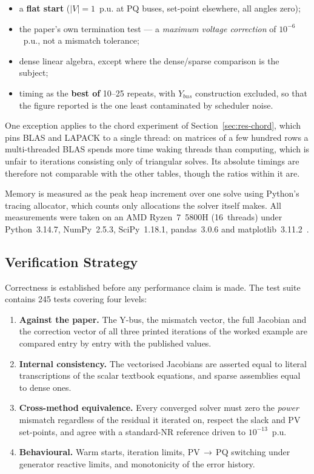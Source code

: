 \documentclass[sigconf,nonacm]{acmart}
\begin{document}
\begin{itemize}
\item a \textbf{flat start} ($|V| = 1$~p.u. at PQ buses, set-point elsewhere,
      all angles zero);
\item the paper's own termination test --- a \emph{maximum voltage correction}
      of $10^{-6}$~p.u., not a mismatch tolerance;
\item dense linear algebra, except where the dense/sparse comparison is the
      subject;
\item timing as the \textbf{best of} 10--25 repeats, with $Y_{bus}$
      construction excluded, so that the figure reported is the one least
      contaminated by scheduler noise.
\end{itemize}

\noindent One exception applies to the chord experiment of
Section~\ref{sec:res-chord}, which pins BLAS and LAPACK to a single thread:
on matrices of a few hundred rows a multi-threaded BLAS spends more time waking
threads than computing, which is unfair to iterations consisting only of
triangular solves. Its absolute timings are therefore not comparable with the
other tables, though the ratios within it are.

Memory is measured as the peak heap increment over one solve using
Python's tracing allocator, which counts only allocations the solver itself
makes. All measurements were taken on an AMD Ryzen~7~5800H (16~threads) under
Python~3.14.7, NumPy~2.5.3, SciPy~1.18.1, pandas~3.0.6 and
matplotlib~3.11.2~\cite{numpy,scipy,matplotlib,pandas}.

\subsection{Verification Strategy}
Correctness is established before any performance claim is made. The test suite
contains 245 tests covering four levels:

\begin{enumerate}
\item \textbf{Against the paper.} The Y-bus, the mismatch vector, the full
      Jacobian and the correction vector of all three printed iterations of the
      worked example are compared entry by entry with the published values.
\item \textbf{Internal consistency.} The vectorised Jacobians are asserted equal
      to literal transcriptions of the scalar textbook equations, and sparse
      assemblies equal to dense ones.
\item \textbf{Cross-method equivalence.} Every converged solver must zero the
      \emph{power} mismatch regardless of the residual it iterated on, respect
      the slack and PV set-points, and agree with a standard-NR reference driven
      to $10^{-13}$~p.u.
\item \textbf{Behavioural.} Warm starts, iteration limits, PV\,$\to$\,PQ
      switching under generator reactive limits, and monotonicity of the error
      history.
\end{enumerate}
\end{document}
